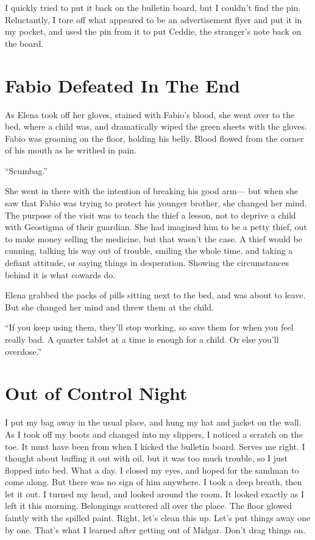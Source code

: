 \documentclass[oneside]{book}
\begin{document}
I quickly tried to put it back on the bulletin board, but I couldn’t find the pin. Reluctantly, I tore off what appeared to be an advertisement flyer and put it in my pocket, and used the pin from it to put Ceddie, the stranger’s note back on the board.

\chapter{Fabio Defeated In The End}
As Elena took off her gloves, stained with Fabio’s blood, she went over to the bed, where a child was, and dramatically wiped the green sheets with the gloves. Fabio was groaning on the floor, holding his belly. Blood flowed from the corner of his mouth as he writhed in pain.

“Scumbag.”

She went in there with the intention of breaking his good arm— but when she saw that Fabio was trying to protect his younger brother, she changed her mind. The purpose of the visit was to teach the thief a lesson, not to deprive a child with Geostigma of their guardian. She had imagined him to be a petty thief, out to make money selling the medicine, but that wasn’t the case. A thief would be cunning, talking his way out of trouble, smiling the whole time, and taking a defiant attitude, or saying things in desperation. Showing the circumstances behind it is what cowards do.

Elena grabbed the packs of pills sitting next to the bed, and was about to leave. But she changed her mind and threw them at the child.

“If you keep using them, they’ll stop working, so save them for when you feel really bad. A quarter tablet at a time is enough for a child. Or else you’ll overdose.”

\chapter{Out of Control Night}
I put my bag away in the usual place, and hung my hat and jacket on the wall. As I took off my boots and changed into my slippers, I noticed a scratch on the toe. It must have been from when I kicked the bulletin board. Serves me right. I thought about buffing it out with oil, but it was too much trouble, so I just flopped into bed. What a day. I closed my eyes, and hoped for the sandman to come along. But there was no sign of him anywhere. I took a deep breath, then let it out. I turned my head, and looked around the room. It looked exactly as I left it this morning. Belongings scattered all over the place. The floor glowed faintly with the spilled paint. Right, let’s clean this up. Let’s put things away one by one. That’s what I learned after getting out of Midgar. Don’t drag things on.
\end{document}
